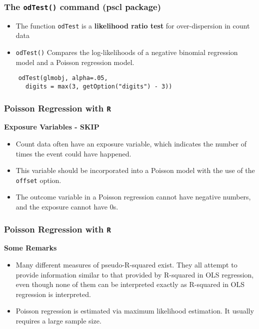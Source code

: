 \documentclass[00-GLMregslides.tex]{subfiles}
\begin{document}
\begin{frame}[fragile]
\frametitle{The \texttt{odTest()} command (pscl package)}
\begin{itemize}
\item	The function \texttt{odTest} is a \textbf{likelihood ratio test} for over-dispersion in count data
	
\item \texttt{odTest()}	Compares the log-likelihoods of a negative binomial regression model and a Poisson regression
	model.
\end{itemize}
	\begin{framed}
	\begin{verbatim}
	odTest(glmobj, alpha=.05, 
	  digits = max(3, getOption("digits") - 3))
\end{verbatim}
\end{framed}
\end{frame}
\begin{frame}[fragile]
	\frametitle{Poisson Regression with \texttt{R}}
	\Large
\textbf{Exposure Variables - SKIP }
	\begin{itemize} 
\item Count data often have an exposure variable, which indicates the number of times the event could have happened. 
\item This variable should be incorporated into a Poisson model with the use of the \texttt{offset} option.
\item The outcome variable in a Poisson regression cannot have negative numbers, and the exposure cannot have 0s.
\end{itemize}
\end{frame}
\begin{frame}[fragile]
	\frametitle{Poisson Regression with \texttt{R}}
	\Large
	
\textbf{Some Remarks}
	\begin{itemize} 

\item Many different measures of pseudo-R-squared exist. They all attempt to provide information similar to that provided by R-squared in OLS regression, even though none of them can be interpreted exactly as R-squared in OLS regression is interpreted.
 
\item Poisson regression is estimated via maximum likelihood estimation. It usually requires a large sample size. 
\end{itemize}
\end{frame}

\end{document}
